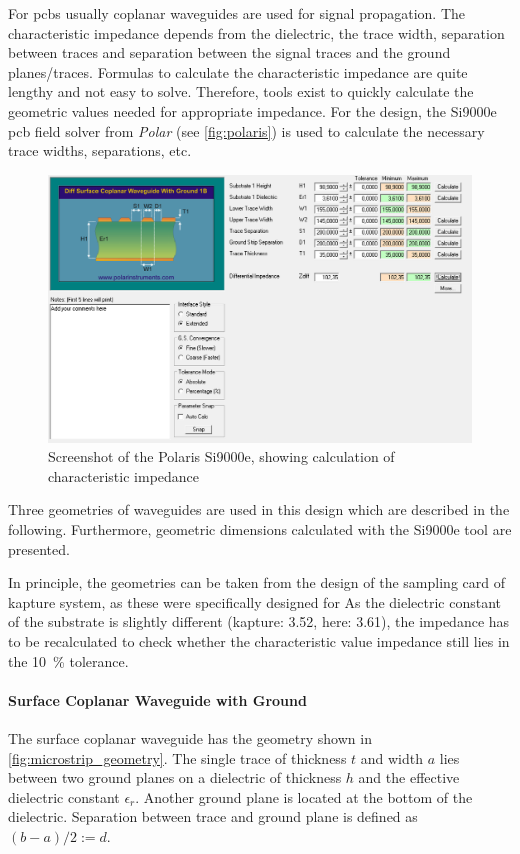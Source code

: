 For \glspl{pcb} usually coplanar waveguides are used for signal propagation.
The characteristic impedance depends from the dielectric, the trace width, separation between traces and separation between the signal traces and the ground planes/traces.
Formulas to calculate the characteristic impedance are quite lengthy and not easy to solve.
Therefore, tools exist to quickly calculate the geometric values needed for appropriate impedance.
For the design, the Si9000e \gls{pcb} field solver from \textit{Polar} (see \autoref{fig:polaris}) is used to calculate the necessary trace widths, separations, etc.

\begin{figure}[tbh]
	\centering
	\includegraphics[width = \textwidth]{chap/04-work/img/polaris}
	\caption[Screenshot of the Polaris Si9000e]{Screenshot of the Polaris Si9000e, showing calculation of characteristic impedance} %
	\label{fig:polaris}
\end{figure}

Three geometries of waveguides are used in this design which are described in the following.
Furthermore, geometric dimensions calculated with the Si9000e tool are presented.

In principle, the geometries can be taken from the design of the sampling card of \gls{kapture} system, as these were specifically designed for 
As the dielectric constant of the substrate is slightly different (\gls{kapture}: 3.52, here: 3.61), the impedance has to be recalculated to check whether the characteristic value impedance still lies in the \SI{10}{\percent} tolerance.

\paragraph{Surface Coplanar Waveguide with Ground}
The surface coplanar waveguide has the geometry shown in \autoref{fig:microstrip_geometry}.
The single trace of thickness $t$ and width $a$ lies between two ground planes on a dielectric of thickness $h$ and the effective dielectric constant $\epsilon_r$.
Another ground plane is located at the bottom of the dielectric.
Separation between trace and ground plane is defined as $(b-a)/2 := d$. 

